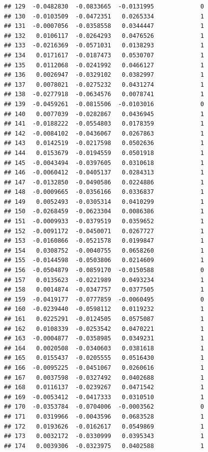 \documentclass[12pt]{article}\usepackage[]{graphicx}\usepackage[]{xcolor}
\makeatletter
\newenvironment{kframe}{%
 \def\at@end@of@kframe{}%
 \ifinner\ifhmode%
  \def\at@end@of@kframe{\end{minipage}}%
  \begin{minipage}{\columnwidth}%
 \fi\fi%
 \def\FrameCommand##1{\hskip\@totalleftmargin \hskip-\fboxsep
 \colorbox{shadecolor}{##1}\hskip-\fboxsep
     \hskip-\linewidth \hskip-\@totalleftmargin \hskip\columnwidth}%
 \MakeFramed {\advance\hsize-\width
   \@totalleftmargin\z@ \linewidth\hsize
   \@setminipage}}%
 {\par\unskip\endMakeFramed%
 \at@end@of@kframe}
\newenvironment{knitrout}{}{} %
\makeatother
\begin{document}
\begin{knitrout}
\begin{kframe}
\begin{verbatim}
## 129  -0.0482830  -0.0833665  -0.0131995             0
## 130  -0.0103509  -0.0472351   0.0265334             1
## 131  -0.0007056  -0.0358558   0.0344447             1
## 132   0.0106117  -0.0264293   0.0476526             1
## 133  -0.0216369  -0.0571031   0.0138293             1
## 134   0.0171617  -0.0187473   0.0530707             1
## 135   0.0112068  -0.0241992   0.0466127             1
## 136   0.0026947  -0.0329102   0.0382997             1
## 137   0.0078021  -0.0275232   0.0431274             1
## 138  -0.0277918  -0.0634576   0.0078741             1
## 139  -0.0459261  -0.0815506  -0.0103016             0
## 140   0.0077039  -0.0282867   0.0436945             1
## 141  -0.0188222  -0.0554803   0.0178359             1
## 142  -0.0084102  -0.0436067   0.0267863             1
## 143   0.0142519  -0.0217598   0.0502636             1
## 144   0.0153679  -0.0194559   0.0501918             1
## 145  -0.0043494  -0.0397605   0.0310618             1
## 146  -0.0060412  -0.0405137   0.0284313             1
## 147  -0.0132850  -0.0490586   0.0224886             1
## 148  -0.0009665  -0.0356166   0.0336837             1
## 149   0.0052493  -0.0305314   0.0410299             1
## 150  -0.0268459  -0.0623304   0.0086386             1
## 151  -0.0009933  -0.0379519   0.0359652             1
## 152  -0.0091172  -0.0450071   0.0267727             1
## 153  -0.0160866  -0.0521578   0.0199847             1
## 154   0.0308752  -0.0040755   0.0658260             1
## 155  -0.0144598  -0.0503806   0.0214609             1
## 156  -0.0504879  -0.0859170  -0.0150588             0
## 157   0.0135623  -0.0221989   0.0493234             1
## 158   0.0014874  -0.0347757   0.0377505             1
## 159  -0.0419177  -0.0777859  -0.0060495             0
## 160  -0.0239440  -0.0598112   0.0119232             1
## 161   0.0225291  -0.0124505   0.0575087             1
## 162   0.0108339  -0.0253542   0.0470221             1
## 163  -0.0004877  -0.0358985   0.0349231             1
## 164   0.0020508  -0.0340603   0.0381618             1
## 165   0.0155437  -0.0205555   0.0516430             1
## 166  -0.0095225  -0.0451067   0.0260616             1
## 167   0.0037598  -0.0327492   0.0402688             1
## 168   0.0116137  -0.0239267   0.0471542             1
## 169  -0.0053412  -0.0417333   0.0310510             1
## 170  -0.0353784  -0.0704006  -0.0003562             0
## 171   0.0319966  -0.0043596   0.0683528             1
## 172   0.0193626  -0.0162617   0.0549869             1
## 173   0.0032172  -0.0330999   0.0395343             1
## 174   0.0039306  -0.0323975   0.0402588             1

\end{verbatim}
\end{kframe}
\end{knitrout}
\end{document}

